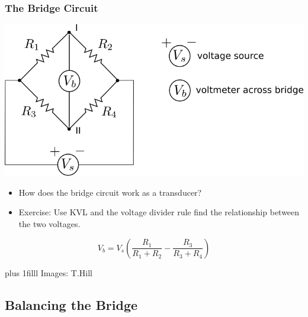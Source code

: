 \documentclass[fleqn]{beamer} %
\newcommand{\sectionIIsubsectionIItitle}{The Bridge Circuit}
\newcommand{\sectionIIsubsectionIIItitle}{Balancing the Bridge}
\newcommand{\btVFill}{\vskip0pt plus 1filll}
\begin{document}
			\begin{frame}
				\frametitle{\sectionIIsubsectionIItitle} \scriptsize
	
				\bigskip


				\includegraphics[scale=.35]{images/bridge_circuit.png} \vspace{5mm} 

				\begin{itemize}
					\item How does the bridge circuit work as a transducer?
					\item Exercise: Use KVL and the voltage divider rule find the relationship between the two voltages. \vspc
				\end{itemize}
				\[V_b=V_s\left( \frac{R_1}{R_1+R_2}-\frac{R_3}{R_3+R_4}\right)\]

				 
				\btVFill
				{\tiny Images: T.Hill}
				
			\end{frame}

		\subsection{\sectionIIsubsectionIIItitle}\label{sectionIIsubsectionIII}
\end{document}
